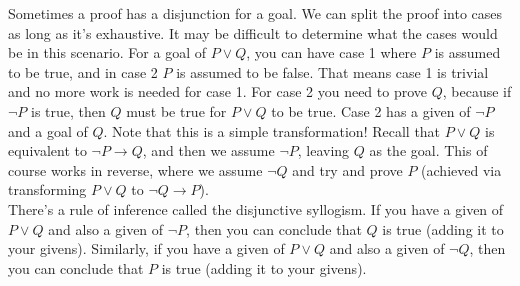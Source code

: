 \documentclass{article}
\begin{document}
\noindent Sometimes a proof has a disjunction for a goal. We can split the proof into cases as long as it's exhaustive. It may be difficult to determine what the cases would be in this scenario. For a goal of $P \lor Q$, you can have case 1 where $P$ is assumed to be true, and in case 2 $P$ is assumed to be false. That means case 1 is trivial and no more work is needed for case 1. For case 2 you need to prove $Q$, because if $\lnot P$ is true, then $Q$ must be true for $P \lor Q$ to be true. Case 2 has a given of $\lnot P$ and a goal of $Q$. Note that this is a simple transformation! Recall that $P \lor Q$ is equivalent to $\lnot P \rightarrow Q$, and then we assume $\lnot P$, leaving $Q$ as the goal. This of course works in reverse, where we assume $\lnot Q$ and try and prove $P$ (achieved via transforming $P \lor Q$ to $\lnot Q \rightarrow P$).\\

\noindent There's a rule of inference called the \gls{disjunctive syllogism}. If you have a given of $P \lor Q$ and also a given of $\lnot P$, then you can conclude that $Q$ is true (adding it to your givens). Similarly, if you have a given of $P \lor Q$ and also a given of $\lnot Q$, then you can conclude that $P$ is true (adding it to your givens).

\clearpage
\printglossary[type=\acronymtype,style=long]  %
\printglossary[type=symbolslist,style=long]   %
\printglossary[type=main]                     %
\end{document}
